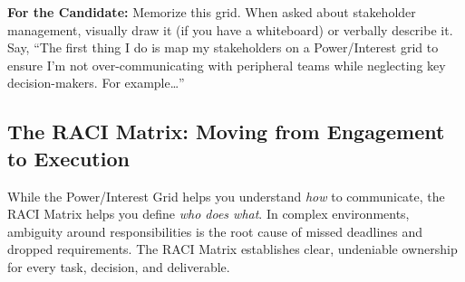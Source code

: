 \documentclass[
  11pt,
  openany,
  oneside]{book}
\renewenvironment{quote}{\begin{customquote}}{\end{customquote}}
\begin{document}
\begin{quote}
\textbf{For the Candidate:} Memorize this grid. When asked about
stakeholder management, visually draw it (if you have a whiteboard) or
verbally describe it. Say, ``The first thing I do is map my stakeholders
on a Power/Interest grid to ensure I'm not over-communicating with
peripheral teams while neglecting key decision-makers. For
example\ldots{}''
\end{quote}

\subsection{The RACI Matrix: Moving from Engagement to
Execution}\label{the-raci-matrix-moving-from-engagement-to-execution}

While the Power/Interest Grid helps you understand \emph{how} to
communicate, the RACI Matrix helps you define \emph{who does what}. In
complex environments, ambiguity around responsibilities is the root
cause of missed deadlines and dropped requirements. The RACI Matrix
establishes clear, undeniable ownership for every task, decision, and
deliverable.
\end{document}
